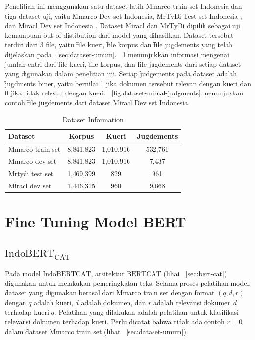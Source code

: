 Penelitian ini menggunakan satu \f{dataset} latih Mmarco train set Indonesia \citep{mmarco} dan tiga \f{dataset} uji, yaitu Mmarco Dev set Indonesia, MrTyDi Test set Indonesia \citep{mrtydi}, dan Miracl Dev set Indonesia \citep{miracl}. \f{Dataset} Miracl dan MrTyDi dipilih sebagai uji kemampuan \f{out-of-distibution} dari model yang dihasilkan. \f{Dataset} tersebut terdiri dari 3 file, yaitu \f{file} kueri, \f{file korpus} dan \f{file jugdements} yang telah dijelaskan pada \sect~\ref{sec:dataset-umum}. \tab~\ref{tab:dataset-info} menunjukkan informasi mengenai jumlah entri dari \f{file} kueri, \f{file korpus}, dan \f{file jugdements} dari setiap \f{dataset} yang digunakan dalam penelitian ini. Setiap \f{judgements} pada \f{dataset} adalah \f{jugdments} biner, yaitu bernilai 1 jika dokumen tersebut relevan dengan kueri dan 0 jika tidak relevan dengan kueri. \pic~\ref{fig:dataset-mircal-judgments} menunjukkan contoh \f{file jugdements} dari \f{dataset} Miracl Dev set Indonesia.


\begin{table}[!ht]
    \centering
    \caption{Dataset Information}
    \label{tab:dataset-info}
    \begin{tabular}{|l|c|c|c|} \hline
        \textbf{Dataset} & \textbf{Korpus} & \textbf{Kueri} & \textbf{Jugdements} \\ \hline
        Mmarco train set & 8,841,823       & 1,010,916      & 532,761             \\ \hline
        Mmarco dev set   & 8,841,823       & 1,010,916      & 7,437               \\ \hline
        Mrtydi test set  & 1,469,399       & 829            & 961                 \\ \hline
        Miracl dev set   & 1,446,315       & 960            & 9,668               \\ \hline
    \end{tabular}
\end{table}

\section{Fine Tuning Model BERT}
\label{sec:finetuning}


\subsection{$\text{IndoBERT}_{\text{CAT}}$}


Pada model $\text{IndoBERT}{\text{CAT}}$, arsitektur $\text{BERT}\text{CAT}$ (lihat \sect~\ref{sec:bert-cat}) digunakan untuk melakukan pemeringkatan teks. Selama proses pelatihan model, \f{dataset} yang digunakan berasal dari Mmarco train set dengan format $(q, d, r)$ dengan $q$ adalah kueri, $d$ adalah dokumen, dan $r$ adalah relevansi dokumen $d$ terhadap kueri $q$. Pelatihan yang dilakukan adalah pelatihan untuk klasifikasi relevansi dokumen terhadap kueri. Perlu dicatat bahwa tidak ada contoh $r=0$ dalam \f{dataset} Mmarco train set (lihat \sect~\ref{sec:dataset-umum}).

